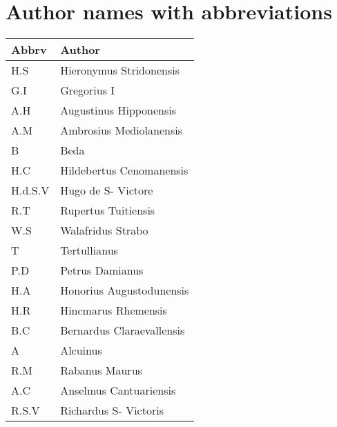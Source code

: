 \documentclass[11pt]{article}
\begin{document}
{}


\newpage

\appendix
\section{Author names with abbreviations}

\begin{tabular}{ll}
\toprule
    Abbrv &                     Author \\
\midrule
      H.S &    Hieronymus Stridonensis \\
      G.I &                Gregorius I \\
      A.H &     Augustinus Hipponensis \\
      A.M &    Ambrosius Mediolanensis \\
      B &                       Beda \\
      H.C &   Hildebertus Cenomanensis \\
      H.d.S.V &         Hugo de S- Victore \\
      R.T &        Rupertus Tuitiensis \\
      W.S &          Walafridus Strabo \\
      T &               Tertullianus \\
      P.D &            Petrus Damianus \\
      H.A &   Honorius Augustodunensis \\
      H.R &        Hincmarus Rhemensis \\
      B.C &  Bernardus Claraevallensis \\
      A &                   Alcuinus \\
      R.M &             Rabanus Maurus \\
      A.C &     Anselmus Cantuariensis \\
      R.S.V &      Richardus S- Victoris \\
\bottomrule
\end{tabular}
\end{document}
